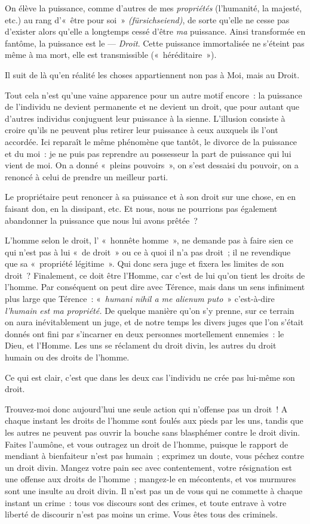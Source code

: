\documentclass[french,twoside]{book} %
\begin{document}
On élève la puissance, comme d’autres de mes \emph{propriétés} (l’humanité, la majesté, etc.) au rang d’« être pour soi » \emph{(fürsichseiend)}, de sorte qu’elle ne cesse pas d’exister alors qu’elle a longtemps cessé d’être \emph{ma} puissance. Ainsi transformée en fantôme, la puissance est le — \emph{Droit}. Cette puissance immortalisée ne s’éteint pas même à ma mort, elle est transmissible (« héréditaire »).\par
Il suit de là qu’en réalité les choses appartiennent non pas à Moi, mais au Droit.\par
Tout cela n’est qu’une vaine apparence pour un autre motif encore : la puissance de l’individu ne devient permanente et ne devient un droit, que  pour autant que d’autres individus conjuguent leur puissance à la sienne. L’illusion consiste à croire qu’ils ne peuvent plus retirer leur puissance à ceux auxquels ils l’ont accordée. Ici reparaît le même phénomène que tantôt, le divorce de la puissance et du moi : je ne puis pas reprendre au possesseur la part de puissance qui lui vient de moi. On a donné « pleins pouvoirs », on s’est dessaisi du pouvoir, on a renoncé à celui de prendre un meilleur parti.\par
Le propriétaire peut renoncer à sa puissance et à son droit sur une chose, en en faisant don, en la dissipant, etc. Et nous, nous ne pourrions pas également abandonner la puissance que nous lui avons prêtée ?\par
L’homme selon le droit, l’ « honnête homme », ne demande pas à faire sien ce qui n’est pas à lui « de droit » ou ce à quoi il n’a pas droit ; il ne revendique que sa « propriété légitime ». Qui donc sera juge et fixera les limites de son droit ? Finalement, ce doit être l’Homme, car c’est de lui qu’on tient les droits de l’homme. Par conséquent on peut dire avec Térence, mais dans un sens infiniment plus large que Térence : « \emph{humani nihil a me alienum puto} » c’est-à-dire \emph{l’humain est ma propriété.} De quelque manière qu’on s’y prenne, sur ce terrain on aura inévitablement un juge, et de notre temps les divers juges que l’on s’était donnés ont fini par s’incarner en deux personnes mortellement ennemies : le Dieu, et l’Homme. Les uns se réclament du droit divin, les autres du droit humain ou des droits de l’homme.\par
Ce qui est clair, c’est que dans les deux cas l’individu ne crée pas lui-même son droit.\par
Trouvez-moi donc aujourd’hui une seule action qui n’offense pas un droit ! A chaque instant les droits de l’homme sont foulés aux pieds par les uns, tandis que les autres ne peuvent pas ouvrir la bouche sans blasphémer contre le droit divin. Faites l’aumône, et vous outragez un droit de l’homme, puisque le rapport de mendiant à bienfaiteur n’est  pas humain ; exprimez un doute, vous péchez contre un droit divin. Mangez votre pain sec avec contentement, votre résignation est une offense aux droits de l’homme ; mangez-le en mécontents, et vos murmures sont une insulte au droit divin. Il n’est pas un de vous qui ne commette à chaque instant un crime : tous vos discours sont des crimes, et toute entrave à votre liberté de discourir n’est pas moins un crime. Vous êtes tous des criminels.\par
\end{document}
